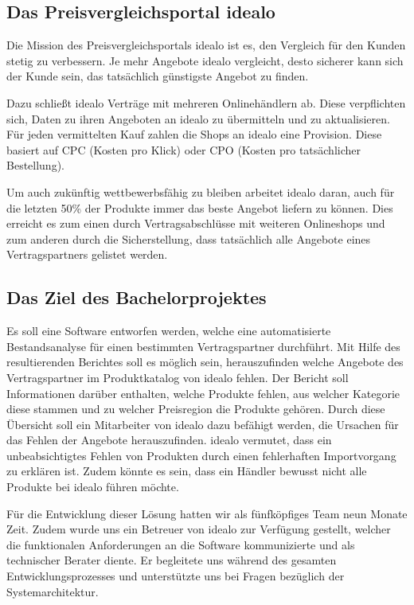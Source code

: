 \subsection{Das Preisvergleichsportal idealo}
\label{subsec:idealo}

Die Mission des Preisvergleichsportals idealo ist es, den Vergleich für den Kunden stetig zu verbessern.
Je mehr Angebote idealo vergleicht, desto sicherer kann sich der Kunde sein, das tatsächlich günstigste Angebot zu
finden.

Dazu schließt idealo Verträge mit mehreren Onlinehändlern ab.
Diese verpflichten sich, Daten zu ihren Angeboten an idealo zu übermitteln und zu aktualisieren.
Für jeden vermittelten Kauf zahlen die Shops an idealo eine Provision.
Diese basiert auf CPC (Kosten pro Klick) oder CPO (Kosten pro tatsächlicher Bestellung).

Um auch zukünftig wettbewerbsfähig zu bleiben arbeitet idealo daran, auch für die letzten 50\% der Produkte
immer das beste Angebot liefern zu können.
Dies erreicht es zum einen durch Vertragsabschlüsse mit weiteren Onlineshops und zum anderen durch die
Sicherstellung, dass tatsächlich alle Angebote eines Vertragspartners gelistet werden.

\subsection{Das Ziel des Bachelorprojektes}
\label{subsec:projektziel}

Es soll eine Software entworfen werden, welche eine automatisierte Bestandsanalyse für einen bestimmten
Vertragspartner durchführt.
Mit Hilfe des resultierenden Berichtes soll es möglich sein, herauszufinden welche Angebote des Vertragspartner im
Produktkatalog von idealo fehlen.
Der Bericht soll Informationen darüber enthalten, welche Produkte fehlen, aus welcher Kategorie diese stammen und zu
welcher Preisregion die Produkte gehören.
Durch diese Übersicht soll ein Mitarbeiter von idealo dazu befähigt werden, die Ursachen für das Fehlen der Angebote
herauszufinden.
idealo vermutet, dass ein unbeabsichtigtes Fehlen von Produkten durch einen fehlerhaften Importvorgang zu erklären ist.
Zudem könnte es sein, dass ein Händler bewusst nicht alle Produkte bei idealo führen möchte.

Für die Entwicklung dieser Lösung hatten wir als fünfköpfiges Team neun Monate Zeit.
Zudem wurde uns ein Betreuer von idealo zur Verfügung gestellt, welcher die funktionalen Anforderungen an die
Software kommunizierte und als technischer Berater diente.
Er begleitete uns während des gesamten Entwicklungsprozesses und unterstützte uns bei Fragen bezüglich der
Systemarchitektur.

